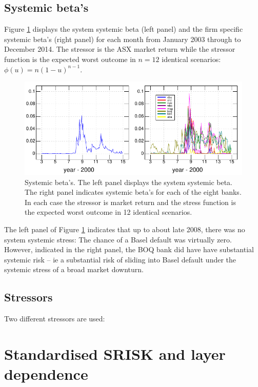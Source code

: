 \documentclass[authoryear]{elsarticle}
\newcommand{\fref}[1]{Figure \ref{#1}}
\begin{document}
\subsection{Systemic beta's}

\fref{Bbeta} displays the system systemic beta (left panel) and the firm specific systemic beta's (right panel)  for each month from January 2003 through to December 2014.   The stressor is the ASX market return while the stressor function is the expected worst outcome in $n=12$ identical scenarios:  $\phi(u)=n(1-u)^{n-1}$.

\begin{figure}[htbp]
\begin{center}
\includegraphics{Bbeta.pdf}
\caption{Systemic beta's.  The left panel displays the system systemic beta.   The right panel indicates systemic beta's for each of the eight banks.  In each case the stressor is market return and the stress function is the expected worst outcome in 12 identical scenarios.}
\label{Bbeta}
\end{center}
\end{figure}

The left panel of \fref{Bbeta} indicates that up to about late 2008, there was no system systemic stress:  The chance of a Basel default was virtually zero.   However, indicated in the right panel, the BOQ bank did have have substantial systemic risk -- ie a substantial risk of sliding into Basel default under the systemic stress of a broad market downturn.

\subsection{Stressors}

Two different stressors are used:   



\section{Standardised SRISK and layer dependence}
\end{document}

